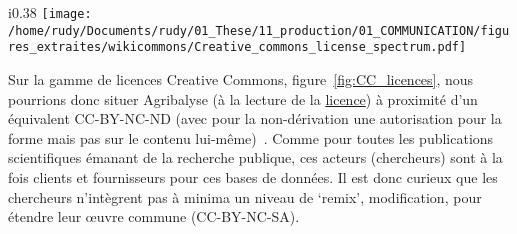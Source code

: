 \begin{wrapfigure}{i}{0.38\textwidth}
\centering
\texttt{[image: /home/rudy/Documents/rudy/01\_These/11\_production/01\_COMMUNICATION/figures\_extraites/wikicommons/Creative\_commons\_license\_spectrum.pdf]}
\caption{ \scriptsize Les licences CC. Par \href{https://commons.wikimedia.org/wiki/File:Creative_commons_license_spectrum.svg?uselang=fr}{Creative commons et Shaddim}}
\label{fig:CC_licences}
\end{wrapfigure}
Sur la gamme de licences Creative Commons, figure~\ref{fig:CC_licences}, nous pourrions donc situer Agribalyse (à la lecture de la \href{https://nexus.openlca.org/ws/files/8209}{licence}) à proximité d'un équivalent CC-BY-NC-ND (avec pour la non-dérivation une autorisation pour la forme mais pas sur le contenu lui-même)~\cite{ademe_general_2013}.
Comme pour toutes les publications scientifiques émanant de la recherche publique, ces acteurs (chercheurs) sont à la fois clients et fournisseurs pour ces bases de données.
Il est donc curieux que les chercheurs n'intègrent pas à minima un niveau de `remix', modification, pour étendre leur œuvre commune (CC-BY-NC-SA).
%
%
%
%
%
%

